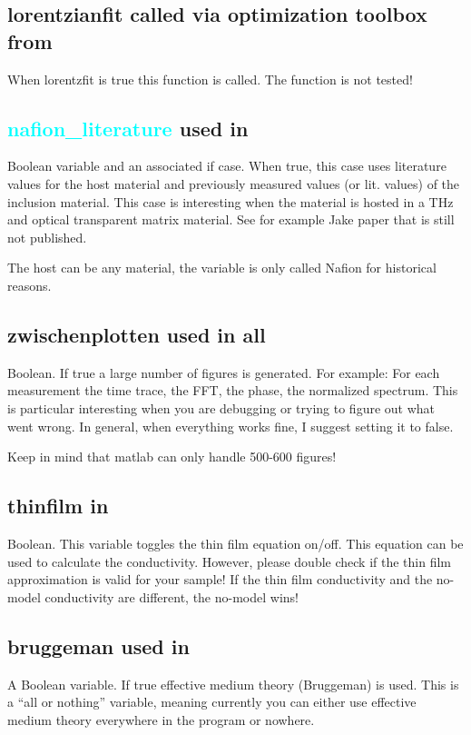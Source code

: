 \documentclass[12pt]{article}
\begin{document}
\subsection{lorentzianfit called via optimization toolbox from \pellets}
When lorentzfit is true this function is called. The function is not tested! 
\subsection{\textcolor{cyan}{nafion\_literature} used in \TRTS}
Boolean variable and an associated if case. When true, this case uses literature values for the host material and previously measured values (or lit. values) of the inclusion material. This case is interesting when the material is hosted in a THz and optical transparent matrix material. See for example Jake paper that is still not published. 

The host can be any material, the variable is only called Nafion for historical reasons. 



\subsection{zwischenplotten used in all}
Boolean. If true a large number of figures is generated. For example: For each measurement the time trace, the FFT, the phase, the normalized spectrum. 
This is particular interesting when you are debugging or trying to figure out what went wrong. In general, when everything works fine, I suggest setting it to false. 

Keep in mind that matlab can only handle 500-600 figures! 
\subsection{thinfilm in \TRTS }
Boolean. This variable toggles the thin film equation on/off. This equation can be used to calculate the conductivity. However, please double check if the thin film approximation is valid for your sample! If the thin film conductivity and the no-model conductivity are different, the no-model wins! 
\subsection{bruggeman used in \TRTS}
A Boolean variable. If true effective medium theory (Bruggeman) is used. This is a "`all or nothing"' variable, meaning currently you can either use effective medium theory everywhere in the program or nowhere.  
\end{document}
